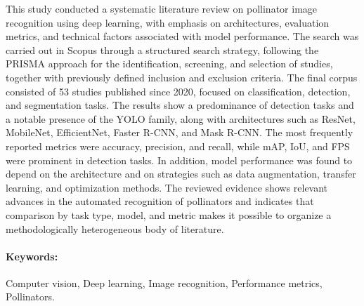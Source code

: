 This study conducted a systematic literature review on pollinator image recognition using deep learning, with emphasis on architectures, evaluation metrics, and technical factors associated with model performance. The search was carried out in Scopus through a structured search strategy, following the PRISMA approach for the identification, screening, and selection of studies, together with previously defined inclusion and exclusion criteria. The final corpus consisted of 53 studies published since 2020, focused on classification, detection, and segmentation tasks. The results show a predominance of detection tasks and a notable presence of the YOLO family, along with architectures such as ResNet, MobileNet, EfficientNet, Faster R-CNN, and Mask R-CNN. The most frequently reported metrics were accuracy, precision, and recall, while mAP, IoU, and FPS were prominent in detection tasks. In addition, model performance was found to depend on the architecture and on strategies such as data augmentation, transfer learning, and optimization methods. The reviewed evidence shows relevant advances in the automated recognition of pollinators and indicates that comparison by task type, model, and metric makes it possible to organize a methodologically heterogeneous body of literature.


\paragraph{Keywords:} Computer vision, Deep learning, Image recognition, Performance metrics, Pollinators.